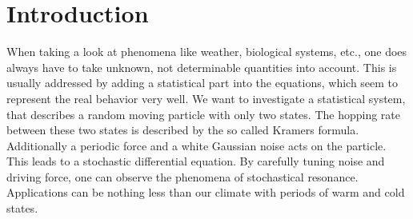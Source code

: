 \documentclass[10pt,fleqn,%
reqno,a4paper]{article}
\begin{document}


\tableofcontents
\newpage
{}

\section{Introduction}
When taking a look at phenomena like weather, biological systems, etc., one does always have to take unknown, not determinable quantities into account. This is usually addressed by adding a statistical part into the equations, which seem to represent the real behavior very well.
We want to investigate a statistical system, that describes a random moving particle with only two states. The hopping rate between these two states is described by the so called Kramers formula. Additionally a periodic force and a white Gaussian noise acts on the particle. This leads to a stochastic differential equation. By carefully tuning noise and driving force, one can observe the phenomena of stochastical resonance.
Applications can be nothing less than our climate with periods of warm and cold states.


\end{document}
